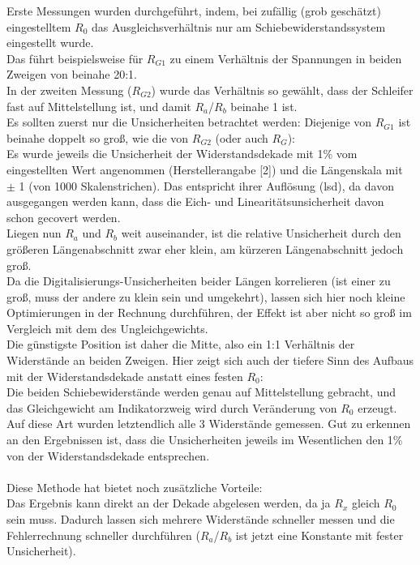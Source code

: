 \documentclass[12pt,a4paper]{article}
\begin{document}
\begin{multicols}{2}
Erste Messungen wurden durchgeführt, indem, bei zufällig (grob geschätzt) eingestelltem $R_0$ das Ausgleichsverhältnis nur am Schiebewiderstandssystem eingestellt wurde.\\
Das führt beispielsweise für $R_{G1}$ zu einem Verhältnis der Spannungen in beiden Zweigen von beinahe 20:1.\\
In der zweiten Messung ($R_{G2}$) wurde das Verhältnis so gewählt, dass der Schleifer fast auf Mittelstellung ist, und damit $R_a$/$R_b$ beinahe 1 ist.\\
Es sollten zuerst nur die Unsicherheiten betrachtet werden: Diejenige von $R_{G1}$ ist beinahe doppelt so groß, wie die von $R_{G2}$ (oder auch $R_G$):\\
Es wurde jeweils die Unsicherheit der Widerstandsdekade mit 1\% vom eingestellten Wert angenommen (Herstellerangabe [2]) und die Längenskala mit $\pm$ 1 (von 1000 Skalenstrichen). Das entspricht ihrer Auflösung (lsd), da davon ausgegangen werden kann, dass die Eich- und Linearitätsunsicherheit davon schon gecovert werden.\\
Liegen nun $R_a$ und $R_b$ weit auseinander, ist die relative Unsicherheit durch den größeren Längenabschnitt zwar eher klein, am kürzeren Längenabschnitt jedoch groß.\\
Da die Digitalisierungs-Unsicherheiten beider Längen korrelieren (ist einer zu groß, muss der andere zu klein sein und umgekehrt), lassen sich hier noch kleine Optimierungen in der Rechnung durchführen, der Effekt ist aber nicht so groß im Vergleich mit dem des Ungleichgewichts.\\
Die günstigste Position ist daher die Mitte, also ein 1:1 Verhältnis der Widerstände an beiden Zweigen. Hier zeigt sich auch der tiefere Sinn des Aufbaus mit der Widerstandsdekade anstatt eines festen $R_0$:
\\
Die beiden Schiebewiderstände werden genau auf Mittelstellung gebracht, und das Gleichgewicht am Indikatorzweig wird durch Veränderung von $R_0$ erzeugt. Auf diese Art wurden letztendlich alle 3 Widerstände gemessen. Gut zu erkennen an den Ergebnissen ist, dass die Unsicherheiten jeweils im Wesentlichen den 1\% von der Widerstandsdekade entsprechen.
\\
\\
Diese Methode hat bietet noch zusätzliche Vorteile:\\
Das Ergebnis kann direkt an der Dekade abgelesen werden, da ja $R_x$ gleich $R_0$ sein muss. Dadurch lassen sich mehrere Widerstände schneller messen und die Fehlerrechnung schneller durchführen ($R_a$/$R_b$ ist jetzt eine Konstante mit fester Unsicherheit).\\

\end{multicols}
\end{document}

